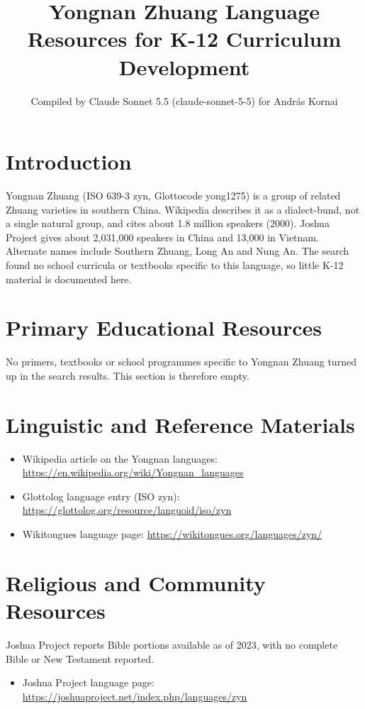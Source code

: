 \documentclass[12pt]{article}
\title{Yongnan Zhuang Language Resources for K-12 Curriculum Development}
\author{Compiled by Claude Sonnet 5.5 (claude-sonnet-5-5) for Andr\'as Kornai}
\date{}
\begin{document}
\maketitle

\section{Introduction}
Yongnan Zhuang (ISO 639-3 zyn, Glottocode yong1275) is a group of related Zhuang varieties in southern China. Wikipedia describes it as a dialect-bund, not a single natural group, and cites about 1.8 million speakers (2000). Joshua Project gives about 2,031,000 speakers in China and 13,000 in Vietnam. Alternate names include Southern Zhuang, Long An and Nung An. The search found no school curricula or textbooks specific to this language, so little K-12 material is documented here.

\section{Primary Educational Resources}
No primers, textbooks or school programmes specific to Yongnan Zhuang turned up in the search results. This section is therefore empty.

\section{Linguistic and Reference Materials}
\begin{itemize}
\item Wikipedia article on the Yongnan languages: \url{https://en.wikipedia.org/wiki/Yongnan_languages}
\item Glottolog language entry (ISO zyn): \url{https://glottolog.org/resource/languoid/iso/zyn}
\item Wikitongues language page: \url{https://wikitongues.org/languages/zyn/}
\end{itemize}

\section{Religious and Community Resources}
Joshua Project reports Bible portions available as of 2023, with no complete Bible or New Testament reported.
\begin{itemize}
\item Joshua Project language page: \url{https://joshuaproject.net/index.php/languages/zyn}
\end{itemize}
\end{document}
